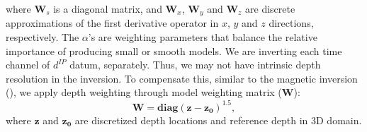 \documentclass[a4paper, 11pt]{article}
\newcommand{\dip}{d^{IP}}
\begin{document}
where $\mathbf{W}_s$ is a diagonal matrix, and $\mathbf{W}_x$, $\mathbf{W}_y$ and $\mathbf{W}_z$ are discrete approximations of the first derivative operator in $x$, $y$ and $z$ directions, respectively.  
The $\alpha$'s are weighting parameters that balance the relative importance of producing small or smooth models.
We are inverting each time channel of $\dip$ datum, separately. Thus, we may not have intrinsic depth resolution in the inversion. 
To compensate this, similar to the magnetic inversion (\cite{LiMag3D}), we apply depth weighting through model weighting matrix ($\mathbf{W}$):
\begin{equation}
    \mathbf{W} = \mathbf{diag}(\mathbf{z-z_0})^{1.5},
    \label{eq: weight_mat}
\end{equation}
where $\mathbf{z}$ and $\mathbf{z_0}$ are discretized depth locations and reference depth in 3D domain.

\end{document}
